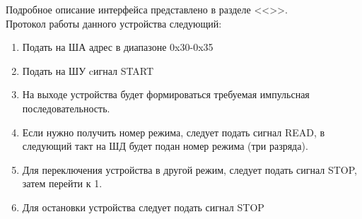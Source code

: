 Подробное описание интерфейса представлено в разделе <<>>.\\
Протокол работы данного устройства следующий:
\begin{enumerate}
\item Подать на ША адрес в диапазоне 0x30-0x35
\item Подать на ШУ cигнал START
\item На выходе устройства будет формироваться требуемая импульсная последовательность.
\item Если нужно получить номер режима, следует подать сигнал READ, в следующий такт на ШД будет подан номер режима (три разряда).
\item Для переключения устройства в другой режим, следует подать сигнал STOP, затем перейти к 1.
\item Для остановки устройства следует подать сигнал STOP
\end{enumerate}